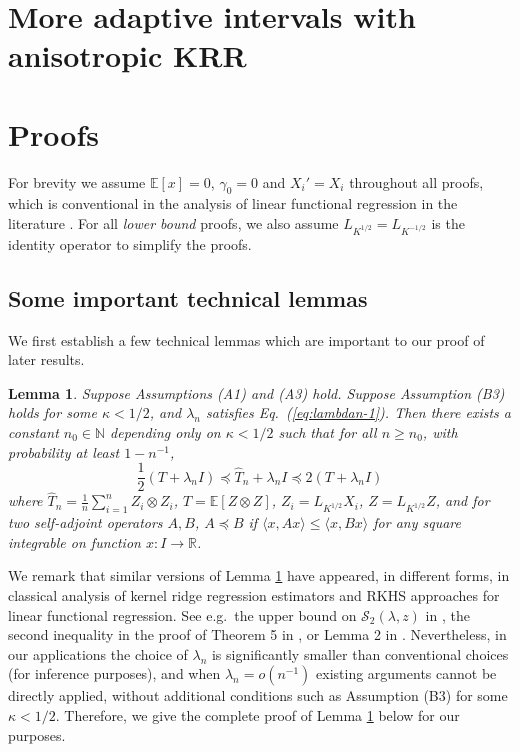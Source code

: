 \documentclass[11pt,a4paper]{article}
\renewcommand{\hat}{\widehat}
\theoremstyle{definition}
\theoremstyle{plain}
\newtheorem{lemma}{Lemma}[section]
\theoremstyle{remark}
\begin{document}
\section{More adaptive intervals with anisotropic KRR}


\section{Proofs}

For brevity we assume $\mathbb E[x]=0$, $\gamma_0=0$ and $X_i'=X_i$ throughout all proofs, which is conventional in the analysis of linear functional regression in the literature \citep{cai2012minimax,yuan2010reproducing}.
For all \emph{lower bound} proofs, we also assume $L_{K^{1/2}}=L_{K^{-1/2}}$ is the identity operator to simplify the proofs.



\subsection{Some important technical lemmas}

We first establish a few technical lemmas which are important to our proof of later results.
\begin{lemma}
Suppose Assumptions (A1) and (A3) hold. Suppose Assumption (B3) holds for some $\kappa<1/2$, and $\lambda_n$ satisfies Eq.~(\ref{eq:lambdan-1}). Then there exists a constant $n_0\in\mathbb N$ depending only on $\kappa<1/2$ such that for all $n\geq n_0$, with probability at least $1-n^{-1}$,
$$
\frac{1}{2}(T+\lambda_n I)\preceq \hat T_n+\lambda_n I\preceq 2(T+\lambda_n I)
$$
where $\hat T_n=\frac{1}{n}\sum_{i=1}^n Z_i\otimes Z_i$, $T=\mathbb E[Z\otimes Z]$, $Z_i=L_{K^{1/2}}X_i$, $Z=L_{K^{1/2}}Z$, and for two self-adjoint operators $A,B$, $A\preceq B$ if $\langle x,Ax\rangle\leq \langle x, Bx\rangle$
for any square integrable on function $x:I\to\mathbb R$.
\label{lem:empirical-population-cov}
\end{lemma}

We remark that similar versions of Lemma \ref{lem:empirical-population-cov} have appeared, in different forms, in classical analysis of kernel ridge regression estimators and RKHS approaches for linear functional regression.
See e.g.~the upper bound on $\mathcal S_2(\lambda,z)$ in \citep{caponnetto2007optimal}, the second inequality in the proof of Theorem 5 in \citep{smale2007learning}, or Lemma 2 in \citep{cai2012minimax}.
Nevertheless, in our applications the choice of $\lambda_n$ is significantly smaller than conventional choices (for inference purposes), and when $\lambda_n = o(n^{-1})$ existing arguments cannot be directly applied,
without additional conditions such as Assumption (B3) for some $\kappa<1/2$. Therefore, we give the complete proof of Lemma \ref{lem:empirical-population-cov} below for our purposes.
\end{document}
